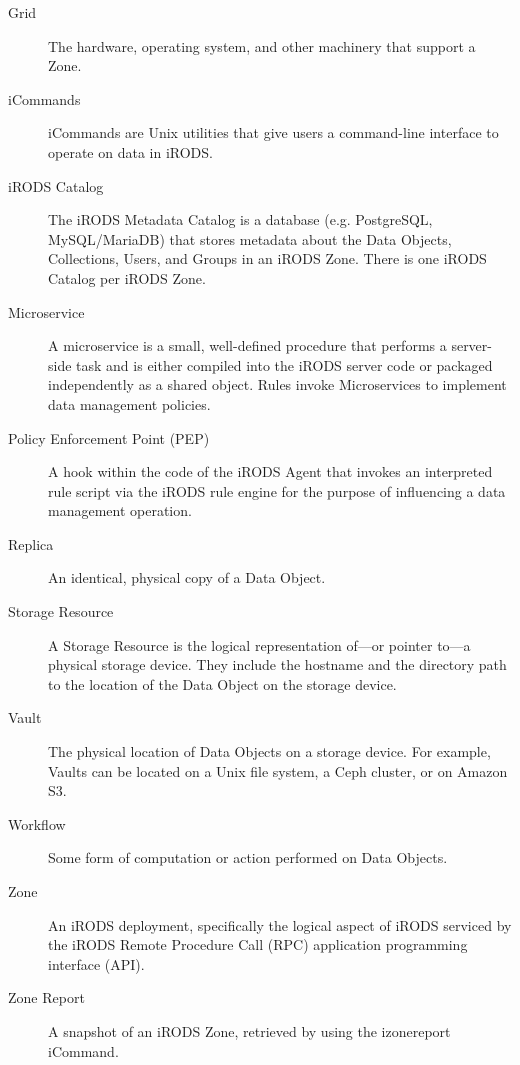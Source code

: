 \documentclass[10pt,oneside]{memoir}
\begin{document}
\begin{description}
\item [Grid]
The hardware, operating system, and other machinery that support a Zone.

\item [iCommands]
iCommands are Unix utilities that give users a command-line interface to operate on data in iRODS.

\item [iRODS Catalog]
The iRODS Metadata Catalog is a database (e.g. PostgreSQL, MySQL/MariaDB) that stores metadata about the Data Objects, Collections, Users, and Groups in an iRODS Zone. There is one iRODS Catalog per iRODS Zone.

\item [Microservice]
A microservice is a small, well-defined procedure that performs a server-side task and is either compiled into the iRODS server code or packaged independently as a shared object. Rules invoke Microservices to implement data management policies.

\item [Policy Enforcement Point (PEP)]
A hook within the code of the iRODS Agent that invokes an interpreted rule script via the iRODS rule engine for the purpose of influencing a data management operation.

\item [Replica]
An identical, physical copy of a Data Object.

\item [Storage Resource]
A Storage Resource is the logical representation of---or pointer to---a physical storage device. They include the hostname and the directory path to the location of the Data Object on the storage device.

\item [Vault]
The physical location of Data Objects on a storage device. For example, Vaults can be located on a Unix file system, a Ceph cluster, or on Amazon S3.

\item [Workflow]
Some form of computation or action performed on Data Objects.

\item [Zone]
An iRODS deployment, specifically the logical aspect of iRODS serviced by the iRODS Remote Procedure Call (RPC) application programming interface (API).

\item [Zone Report]
A snapshot of an iRODS Zone, retrieved by using the izonereport iCommand.

\end{description}
\end{document}
